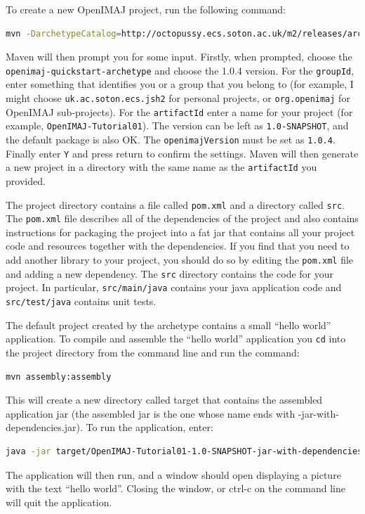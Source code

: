 \documentclass[10pt,a4paper,twoside,extrafontsizes]{memoir}
\begin{document}
To create a new OpenIMAJ project, run the following command:
\begin{lstlisting}[language=bash]
mvn -DarchetypeCatalog=http://octopussy.ecs.soton.ac.uk/m2/releases/archetype-catalog.xml archetype:generate
\end{lstlisting}

Maven will then prompt you for some input.  Firstly, when prompted, choose 
the \texttt{openimaj-quickstart-archetype} and choose the 1.0.4 version. For the \verb+groupId+, 
enter something that identifies you or a group that you belong to (for example, I might choose 
\verb+uk.ac.soton.ecs.jsh2+ for personal projects, or \verb+org.openimaj+ for OpenIMAJ sub-projects). 
For the \verb+artifactId+ enter a name for your project (for example, \verb+OpenIMAJ-Tutorial01+). The 
version can be left as \verb+1.0-SNAPSHOT+, and the default package is also OK. The 
\verb+openimajVersion+ must be set as \verb+1.0.4+. Finally enter \verb+Y+ and press return
to confirm the settings. Maven will then generate a new project in a directory with the same 
name as the \verb+artifactId+ you provided.

The project directory contains a file called \verb+pom.xml+ and a directory called \verb+src+. 
The \verb+pom.xml+ file describes all of the dependencies of the project and also contains 
instructions for packaging the project into a fat jar that contains all your project code and 
resources together with the dependencies. If you find that you need to add another library to 
your project, you should do so by editing the \verb+pom.xml+ file and adding a new dependency. 
The \verb+src+ directory contains the code for your project. In particular, \verb+src/main/java+ 
contains your java application code and \verb+src/test/java+ contains unit tests.

The default project created by the archetype contains a small ``hello world'' application. To 
compile and assemble the ``hello world'' application you \verb+cd+ into the project directory 
from the command line and run the command:
\begin{lstlisting}[language=bash]
mvn assembly:assembly
\end{lstlisting}
This will create a new directory called target that contains the assembled application jar 
(the assembled jar is the one whose name ends with -jar-with-dependencies.jar). To run the 
application, enter:
\begin{lstlisting}[language=bash]
java -jar target/OpenIMAJ-Tutorial01-1.0-SNAPSHOT-jar-with-dependencies.jar
\end{lstlisting}
The application will then run, and a window should open displaying a picture with the text 
``hello world''. Closing the window, or ctrl-c on the command line will quit the application.
\end{document}
